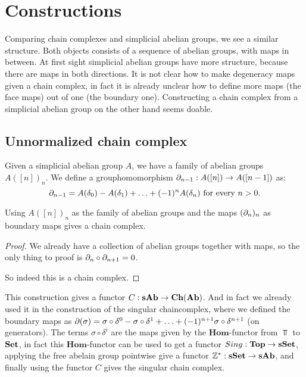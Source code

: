 \section{Constructions}
\label{sec:Constructions}

Comparing chain complexes and simplicial abelian groups, we see a similar structure. Both objects consists of a sequence of abelian groups, with maps in between. At first sight simplicial abelian groups have more structure, because there are maps in both directions. It is not clear how to make degeneracy maps given a chain complex, in fact it is already unclear how to define more maps (the face maps) out of one (the boundary one). Constructing a chain complex from a simplicial abelian group on the other hand seems doable.

\subsection{Unnormalized chain complex}
Given a simplicial abelian group $A$, we have a family of abelian groups $A([n])_n$. We define a grouphomomorphism $\partial_{n-1} : A([n]) \to A([n-1])$ as:
$$\partial_{n-1} = A(\delta_0) - A(\delta_1) + \ldots + (-1)^n A(\delta_n) \text{ for every } n > 0.$$
\begin{lemma}
	Using $A([n])_n$ as the family of abelian groups and the maps $(\partial_n)_n$ as boundary maps gives a chain complex.
\end{lemma}
\begin{proof}
	We already have a collection of abelian groups together with maps, so the only thing to proof is $\partial_n \circ \partial_{n+1} = 0$.


	So indeed this is a chain complex.
\end{proof}

This construction gives a functor $C : \mathbf{sAb} \to \mathbf{Ch}(\mathbf{Ab})$. And in fact we already used it in the construction of the singular chaincomplex, where we defined the boundary maps as $\partial(\sigma) = \sigma \circ \delta^0 - \sigma \circ \delta^1 + \ldots + (-1)^{n+1} \sigma \circ \delta^{n+1}$ (on generators). The terms $\sigma \circ \delta^i$ are the maps given by the $\mathbf{Hom}$-functor from $\Top$ to $\mathbf{Set}$, in fact this $\mathbf{Hom}$-functor can be used to get a functor $Sing : \mathbf{Top} \to \mathbf{sSet}$, applying the free abelain group pointwise give a functor $\mathbb{Z}^\ast : \mathbf{sSet} \to \mathbf{sAb}$, and finally using the functor $C$ gives the singular chain complex.

